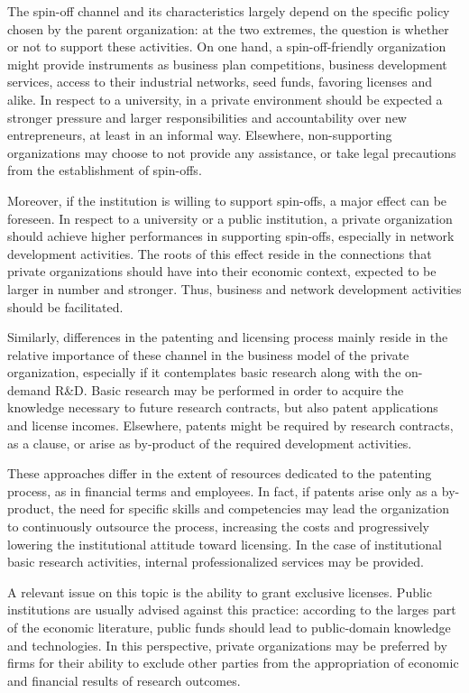 The spin-off channel and its characteristics largely depend on the specific policy chosen by the parent organization: at the two extremes, the question is whether or not to support these activities. On one hand, a spin-off-friendly organization might provide instruments as business plan competitions, business development services, access to their industrial networks, seed funds, favoring licenses and alike. In respect to a university, in a private environment should be expected a stronger pressure and larger responsibilities and accountability over new entrepreneurs, at least in an informal way. Elsewhere, non-supporting organizations may choose to not provide any assistance, or take legal precautions from the establishment of spin-offs.

Moreover, if the institution is willing to support spin-offs, a major effect can be foreseen. In respect to a university or a public institution, a private organization should achieve higher performances in supporting spin-offs, especially in network development activities. The roots of this effect reside in the connections that private organizations should have into their economic context, expected to be larger in number and stronger. Thus, business and network development activities should be facilitated.

Similarly, differences in the patenting and licensing process mainly reside in the relative importance of these channel in the business model of the private organization, especially if it contemplates basic research along with the on-demand R\&D. Basic research may be performed in order to acquire the knowledge necessary to future research contracts, but also patent applications and license incomes. Elsewhere, patents might be required by research contracts, as a clause, or arise as by-product of the required development activities.

These approaches differ in the extent of resources dedicated to the patenting process, as in financial terms and employees. In fact, if patents arise only as a by-product, the need for specific skills and competencies may lead the organization to continuously outsource the process, increasing the costs and progressively lowering the institutional attitude toward licensing. In the case of institutional basic research activities, internal professionalized services may be provided.

A relevant issue on this topic is the ability to grant exclusive licenses. Public institutions are usually advised against this practice: according to the larges part of the economic literature, public funds should lead to public-domain knowledge and technologies. In this perspective, private organizations may be preferred by firms for their ability to exclude other parties from the appropriation of economic and financial results of research outcomes.

